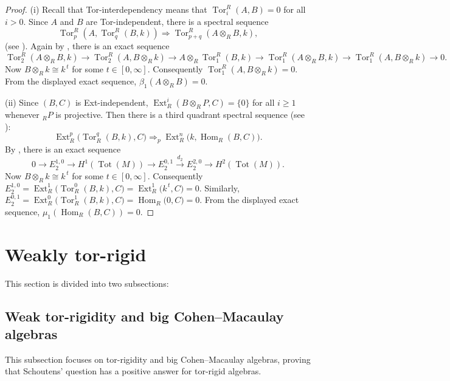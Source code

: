 \documentclass[11pt,a4paper]{amsart}
\numberwithin{equation}{section}
\theoremstyle{definition}
\theoremstyle{remark}
\newcommand{\Tor}{\operatorname{Tor}}
\begin{document}
\begin{proof}
(i)	Recall that Tor-interdependency means that $\Tor^R_i(A,B)=0$ for all $i>0$.
Since \(A\) and \(B\) are Tor-independent, there is a spectral sequence
	\[
	\operatorname{Tor}_p^R(A,\operatorname{Tor}_q^R(B,k)) \Longrightarrow \operatorname{Tor}_{p+q}^R(A\otimes_R B,k),
	\]
	(see \cite[Theorem 10.59]{Rot}). Again by \cite[Theorem 10.31]{Rot}, there is an exact sequence
	\[
	\operatorname{Tor}_2^R(A\otimes_R B,k) \to \operatorname{Tor}_2^R(A,B\otimes_R k) \to A\otimes_R \operatorname{Tor}_1^R(B,k) \to \operatorname{Tor}_1^R(A\otimes_R B,k) \to \operatorname{Tor}_1^R(A,B\otimes_R k) \to 0.
	\]
	Now \(B\otimes_R k \cong k^{\,t}\) for some \(t\in[0,\infty]\). Consequently \(\operatorname{Tor}_1^R(A,B\otimes_R k)=0\). From the displayed exact sequence, \(\beta_1(A\otimes_R B)=0\).

(ii)
	Since \((B,C)\) is Ext-independent, 
$\operatorname{Ext}_R^i(B \otimes_R P, C) = \{0\}
$
	for all $i \ge 1$ whenever ${}_R P$ is projective. 
	Then there is a third quadrant spectral sequence (see \cite[Theorem 10.62]{Rot}):
	\[
	\operatorname{Ext}_R^p\bigl(\operatorname{Tor}_R^q(B, k), C\bigr) 
	\Rightarrow_p \operatorname{Ext}_R^n\bigl(k, \operatorname{Hom}_R(B, C)\bigr).
	\]
	  By \cite[Theorem 10.33]{Rot}, there is an exact sequence
		\[
	0 \longrightarrow E_2^{1,0} \longrightarrow H^1(\operatorname{Tot}(M)) 
	\longrightarrow E_2^{0,1} \xrightarrow{d_2} E_2^{2,0} 
	\longrightarrow H^2(\operatorname{Tot}(M)).
	\]
	Now \(B\otimes_R k \cong k^{\,t}\) for some  \(t\in[0,\infty]\). Consequently 
	$E_2^{1,0}=\operatorname{Ext}_R^1\bigl(\operatorname{Tor}_R^0(B, k), C\bigr)=\operatorname{Ext}_R^1\bigl(k^{\,t}, C\bigr)=0$. Similarly,  
	$E_2^{0,1}=\operatorname{Ext}_R^0\bigl(\operatorname{Tor}_R^1(B, k), C\bigr)=\operatorname{Hom}_R \bigl(0, C\bigr)=0$.
 From the displayed exact sequence, \(\mu_1(\operatorname{Hom}_R(B, C))=0\).
\end{proof}



	\section{Weakly tor-rigid}
This section is divided into two subsections:
	\subsection{Weak tor-rigidity and big Cohen--Macaulay algebras}
	
	This subsection focuses on tor-rigidity and big Cohen--Macaulay algebras, proving that Schoutens' question has a positive answer for tor-rigid algebras.
	
\end{document}
